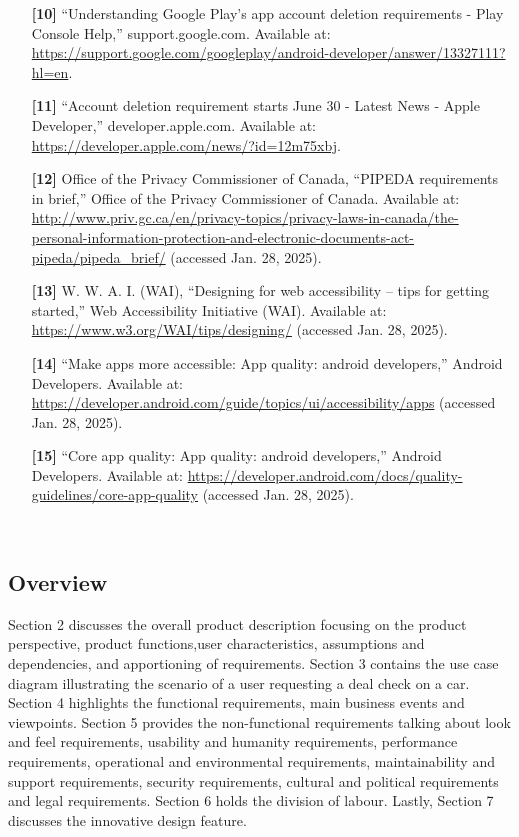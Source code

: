 \documentclass[]{article}
\begin{document}
\begin{enumerate}
    \item [\textbf{[10]}] “Understanding Google Play’s app account deletion requirements - Play Console Help,” support.google.com. Available at: \url{https://support.google.com/googleplay/android-developer/answer/13327111?hl=en}.
    
    \item [\textbf{[11]}] “Account deletion requirement starts June 30 - Latest News - Apple Developer,” developer.apple.com. Available at: \url{https://developer.apple.com/news/?id=12m75xbj}.
    
    \item [\textbf{[12]}] Office of the Privacy Commissioner of Canada, “PIPEDA requirements in brief,” Office of the Privacy Commissioner of Canada. Available at: \url{http://www.priv.gc.ca/en/privacy-topics/privacy-laws-in-canada/the-personal-information-protection-and-electronic-documents-act-pipeda/pipeda_brief/} (accessed Jan. 28, 2025).
    
    \item [\textbf{[13]}] W. W. A. I. (WAI), “Designing for web accessibility – tips for getting started,” Web Accessibility Initiative (WAI). Available at: \url{https://www.w3.org/WAI/tips/designing/} (accessed Jan. 28, 2025).
    
    \item [\textbf{[14]}] “Make apps more accessible: App quality: android developers,” Android Developers. Available at: \url{https://developer.android.com/guide/topics/ui/accessibility/apps} (accessed Jan. 28, 2025).
    
    \item [\textbf{[15]}] “Core app quality: App quality: android developers,” Android Developers. Available at: \url{https://developer.android.com/docs/quality-guidelines/core-app-quality} (accessed Jan. 28, 2025).
    
    
‌
\end{enumerate}

\subsection{Overview}
\label{sub:overview}
Section 2 discusses the overall product description focusing on the product perspective, product functions,user characteristics, assumptions and dependencies, and apportioning of requirements. Section 3 contains the use case diagram illustrating the scenario of a user requesting a deal check on a car. Section 4 highlights the functional requirements, main business events and viewpoints. Section 5 provides the non-functional requirements talking about look and feel requirements, usability and humanity requirements, performance requirements, operational and environmental requirements, maintainability and support requirements, security requirements, cultural and political requirements and legal requirements. Section 6 holds the division of labour. Lastly, Section 7 discusses the innovative design feature.
\end{document}
